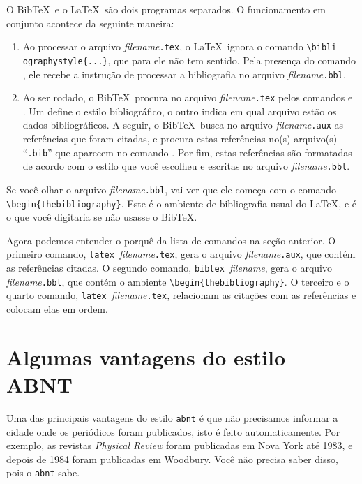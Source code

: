 \documentclass[a4paper,12pt]{article}
\newcommand{\ca}{\c{c}\~ao}
\newcommand{\co}{\c{c}\~oes}
\begin{document}
O Bib\TeX\ e o \LaTeX\ s\~ao dois programas separados.
O funcionamento em conjunto acontece da seguinte maneira:
\begin{enumerate}
\item 
Ao processar o arquivo {\it filename}\verb+.tex+,
o \LaTeX\ ignora o comando \verb+\bibli+ \verb+ographystyle{...}+,
que para ele n\~ao tem sentido. Pela presen\c{c}a do comando
\verb++, ele recebe a instru{\ca} de processar a
bibliografia no arquivo {\it filename}\verb+.bbl+. 
\item
Ao ser rodado, o Bib\TeX\, procura no arquivo
{\it filename}\verb+.tex+ pelos comandos \verb++
e \verb++. Um define o estilo bibliogr\'afico, o outro
indica em qual arquivo est\~ao os dados bibliogr\'aficos.
A seguir, o Bib\TeX\ busca no arquivo
{\it filename}\verb+.aux+ as refer\^encias que foram citadas,
e procura estas refer\^encias no(s) arquivo(s) ``\verb+.bib+'' que
aparecem no comando \verb++.
Por fim, estas refer\^encias s\~ao formatadas de acordo com o estilo que
voc\^e escolheu e escritas no arquivo {\it filename}\verb+.bbl+.
\end{enumerate}

Se voc\^e olhar o arquivo {\it filename}\verb+.bbl+, 
vai ver que ele come\c{c}a com o comando \verb+\begin{thebibliography}+.
Este \'e o ambiente de bibliografia usual do \LaTeX , e \'e
o que voc\^e digitaria se n\~ao usasse o Bib\TeX .

Agora podemos entender o porqu\^e da lista de comandos na se{\ca}
anterior. O primeiro comando, \verb+latex +{\it filename}\verb+.tex+,
gera o arquivo {\it filename}\verb+.aux+, que cont\'em as refer\^encias
citadas. O segundo comando, \verb+bibtex +{\it filename},
gera o arquivo {\it filename}\verb+.bbl+, que cont\'em o ambiente
\verb+\begin{thebibliography}+. O terceiro e o quarto comando,
\verb+latex +{\it filename}\verb+.tex+, relacionam as cita{\co}
com as refer\^encias e colocam elas em ordem.




\section{Algumas vantagens do estilo ABNT}
\label{sec_abnt}


Uma das principais vantagens do estilo \verb+abnt+ \'e que n\~ao
precisamos informar a cidade onde os peri\'odicos foram publicados,
isto \'e feito automaticamente. Por exemplo, as revistas 
{\em Physical Review} foram publicadas em Nova York at\'e 1983, e depois de
1984 foram publicadas em Woodbury. Voc\^e n\~ao precisa
saber disso, pois o \verb+abnt+ sabe.
\end{document}
